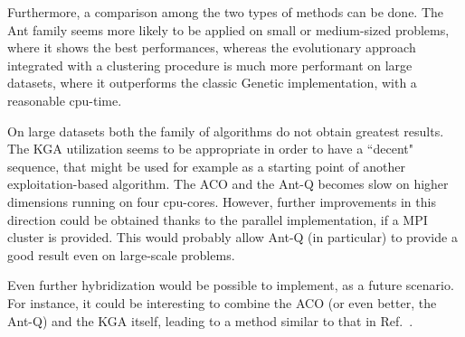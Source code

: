 \documentclass[10pt]{article}
\begin{document}
Furthermore, a comparison among the two types of methods can be done. The Ant family seems more likely to be applied on small or medium-sized problems, where it shows the best performances, whereas the evolutionary approach integrated with a clustering procedure is much more performant on large datasets, where it outperforms the classic Genetic implementation, with a reasonable cpu-time. 

On large datasets both the family of algorithms do not obtain greatest results. The KGA utilization seems to be appropriate in order to have a ``decent" sequence, that might be used for example as a starting point of another exploitation-based algorithm. The ACO and the Ant-Q becomes slow on higher dimensions running on four cpu-cores. However, further improvements in this direction could be obtained thanks to the parallel implementation, if a MPI cluster is provided. This would probably allow Ant-Q (in particular) to provide a good result even on large-scale problems.

Even further hybridization would be possible to implement, as a future scenario. For instance, it could be interesting to combine the ACO (or even better, the Ant-Q) and the KGA itself, leading to a method similar to that in Ref.~\cite{mixed}.

\end{document}
